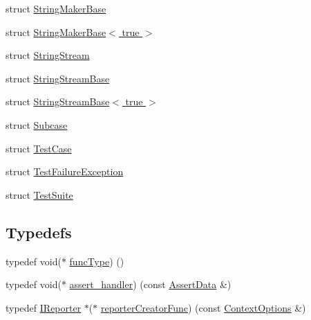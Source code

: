 \begin{DoxyCompactItemize}
\item 
struct \hyperlink{structdoctest_1_1detail_1_1StringMakerBase}{String\+Maker\+Base}
\item 
struct \hyperlink{structdoctest_1_1detail_1_1StringMakerBase_3_01true_01_4}{String\+Maker\+Base$<$ true $>$}
\item 
struct \hyperlink{structdoctest_1_1detail_1_1StringStream}{String\+Stream}
\item 
struct \hyperlink{structdoctest_1_1detail_1_1StringStreamBase}{String\+Stream\+Base}
\item 
struct \hyperlink{structdoctest_1_1detail_1_1StringStreamBase_3_01true_01_4}{String\+Stream\+Base$<$ true $>$}
\item 
struct \hyperlink{structdoctest_1_1detail_1_1Subcase}{Subcase}
\item 
struct \hyperlink{structdoctest_1_1detail_1_1TestCase}{Test\+Case}
\item 
struct \hyperlink{structdoctest_1_1detail_1_1TestFailureException}{Test\+Failure\+Exception}
\item 
struct \hyperlink{structdoctest_1_1detail_1_1TestSuite}{Test\+Suite}
\end{DoxyCompactItemize}
\subsection*{Typedefs}
\begin{DoxyCompactItemize}
\item 
typedef void($\ast$ \hyperlink{namespacedoctest_1_1detail_a7b2c60631c5f4906b26acf2e6b0e6e45}{func\+Type}) ()
\item 
typedef void($\ast$ \hyperlink{namespacedoctest_1_1detail_a5b5db6997f20389de5735e3ee3439b95}{assert\+\_\+handler}) (const \hyperlink{structdoctest_1_1AssertData}{Assert\+Data} \&)
\item 
typedef \hyperlink{structdoctest_1_1IReporter}{I\+Reporter} $\ast$($\ast$ \hyperlink{namespacedoctest_1_1detail_a030c0c44c25bdebe6a83858d1f454f72}{reporter\+Creator\+Func}) (const \hyperlink{structdoctest_1_1ContextOptions}{Context\+Options} \&)
\end{DoxyCompactItemize}
